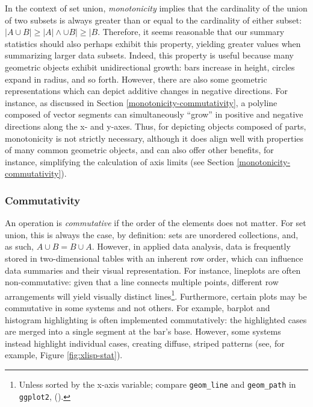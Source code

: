 \documentclass[
  openany]{book}
\theoremstyle{definition}
\theoremstyle{definition}
\theoremstyle{definition}
\theoremstyle{definition}
\theoremstyle{remark}
\begin{document}
In the context of set union, \emph{monotonicity} implies that the cardinality of the union of two subsets is always greater than or equal to the cardinality of either subset: \(\lvert A \cup B \rvert \geq \lvert A \rvert \land \cup B \rvert \geq \lvert B\). Therefore, it seems reasonable that our summary statistics should also perhaps exhibit this property, yielding greater values when summarizing larger data subsets. Indeed, this property is useful because many geometric objects exhibit unidirectional growth: bars increase in height, circles expand in radius, and so forth. However, there are also some geometric representations which can depict additive changes in negative directions. For instance, as discussed in Section \ref{monotonicity-commutativity}, a polyline composed of vector segments can simultaneously ``grow'' in positive and negative directions along the x- and y-axes. Thus, for depicting objects composed of parts, monotonicity is not strictly necessary, although it does align well with properties of many common geometric objects, and can also offer other benefits, for instance, simplifying the calculation of axis limits (see Section \ref{monotonicity-commutativity}).

\subsubsection{Commutativity}\label{commutativity-1}

An operation is \emph{commutative} if the order of the elements does not matter. For set union, this is always the case, by definition: sets are unordered collections, and, as such, \(A \cup B = B \cup A\). However, in applied data analysis, data is frequently stored in two-dimensional tables with an inherent row order, which can influence data summaries and their visual representation. For instance, lineplots are often non-commutative: given that a line connects multiple points, different row arrangements will yield visually distinct lines\footnote{Unless sorted by the x-axis variable; compare \texttt{geom\_line} and \texttt{geom\_path} in \texttt{ggplot2}, ().}. Furthermore, certain plots may be commutative in some systems and not others. For example, barplot and histogram highlighting is often implemented commutatively: the highlighted cases are merged into a single segment at the bar's base. However, some systems instead highlight individual cases, creating diffuse, striped patterns (see, for example, Figure \ref{fig:xlisp-stat}).
\end{document}
